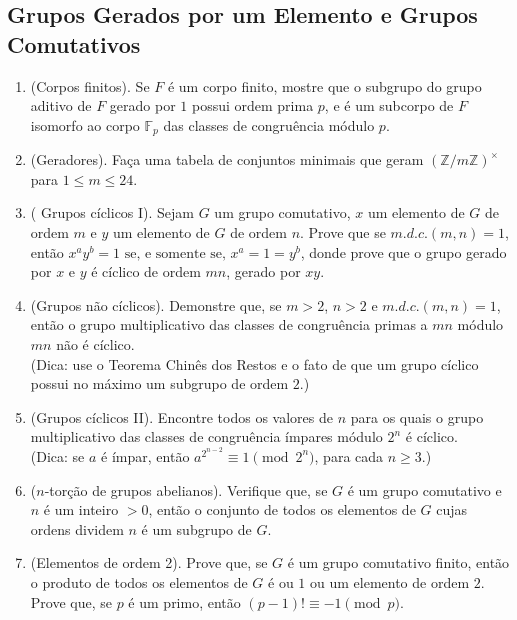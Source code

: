 \subsection{ Grupos Gerados por um Elemento e Grupos Comutativos}

\begin{enumerate}[label=11.\arabic*.]

    \item (Corpos finitos). Se $F$ é um corpo finito, mostre que o subgrupo do grupo aditivo de $F$ 
    gerado por $1$ possui ordem prima $p$, e é um subcorpo de $F$ isomorfo ao corpo $\mathbb{F}_p$ 
    das classes de congruência módulo $p$. 

    \item (Geradores). Faça uma tabela de conjuntos minimais que geram $(\mathbb{Z}/m\mathbb{Z})^\times$ 
    para $1 \leq m \leq 24$. 

    \item ( Grupos cíclicos I). Sejam $G$ um grupo comutativo, $x$ um elemento de $G$ de ordem $m$ e $y$ 
    um elemento de $G$ de ordem $n$. Prove que se $m.d.c.(m,n)=1$, então 
    $x^a y^b = 1 \text{ se, e somente se, } x^a = 1 = y^b$, 
    donde prove que o grupo gerado por $x$ e $y$ é cíclico de ordem $mn$, gerado por $xy$. 

    \item (Grupos não cíclicos). Demonstre que, se $m > 2$, $n > 2$ e $m.d.c.(m,n)=1$, então o grupo 
    multiplicativo das classes de congruência primas a $mn$ módulo $mn$ não é cíclico. 
    \\ (Dica: use o Teorema Chinês dos Restos e o fato de que um grupo cíclico possui no máximo um subgrupo de ordem $2$.)

    \item (Grupos cíclicos II). Encontre todos os valores de $n$ para os quais o grupo multiplicativo das 
    classes de congruência ímpares módulo $2^n$ é cíclico. 
    \\ (Dica: se $a$ é ímpar, então $a^{2^{n-2}} \equiv 1 \pmod{2^n}$, para cada $n \geq 3$.)

    \item ($n$-torção de grupos abelianos). Verifique que, se $G$ é um grupo comutativo e $n$ é um inteiro 
    $>0$, então o conjunto de todos os elementos de $G$ cujas ordens dividem $n$ é um subgrupo de $G$. 

    \item (Elementos de ordem 2). Prove que, se $G$ é um grupo comutativo finito, então o produto de todos 
    os elementos de $G$ é ou $1$ ou um elemento de ordem $2$. Prove que, se $p$ é um primo, então 
    $(p-1)! \equiv -1 \pmod{p}$.
    

\end{enumerate}
